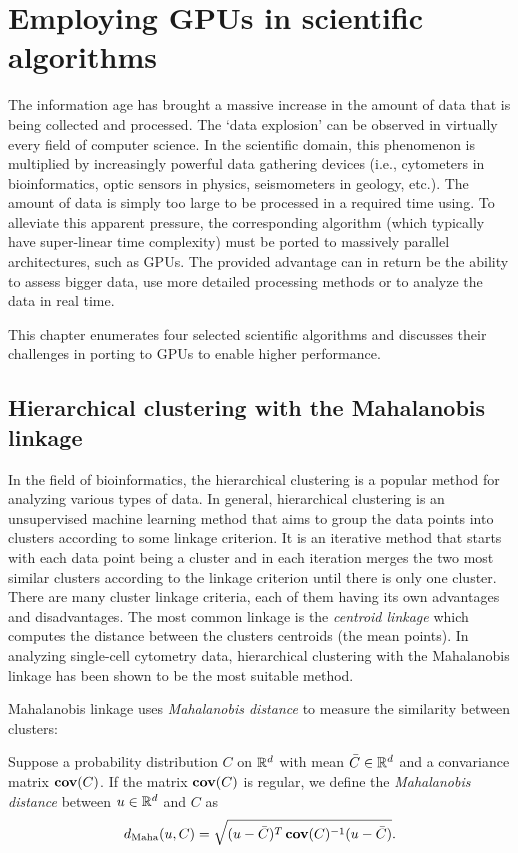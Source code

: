 \chapter{Employing GPUs in scientific algorithms}

The information age has brought a massive increase in the amount of data that is being collected and processed. The `data explosion' can be observed in virtually every field of computer science. In the scientific domain, this phenomenon is multiplied by increasingly powerful data gathering devices (i.e., cytometers in bioinformatics, optic sensors in physics, seismometers in geology, etc.). The amount of data is simply too large to be processed in a required time using. To alleviate this apparent pressure, the corresponding algorithm (which typically have super-linear time complexity) must be ported to massively parallel architectures, such as GPUs. The provided advantage can in return be the ability to assess bigger data, use more detailed processing methods or to analyze the data in real time.

This chapter enumerates four selected scientific algorithms and discusses their challenges in porting to GPUs to enable higher performance.

\section{Hierarchical clustering with the Ma\-ha\-la\-no\-bis linkage}

In the field of bioinformatics, the hierarchical clustering is a popular method for analyzing various types of data. 
In general, hierarchical clustering is an unsupervised machine learning method that aims to group the data points into clusters according to some linkage criterion.
It is an iterative method that starts with each data point being a cluster and in each iteration merges the two most similar clusters according to the linkage criterion until there is only one cluster.
There are many cluster linkage criteria, each of them having its own advantages and disadvantages. 
The most common linkage is the \emph{centroid linkage} which computes the distance between the clusters centroids (the mean points).
In analyzing single-cell cytometry data, hierarchical clustering with the Mahalanobis linkage has been shown to be the most suitable method.

Mahalanobis linkage uses \emph{Mahalanobis distance} to measure the similarity between clusters:
\begin{defn}
	Suppose a probability distribution $C$ on $\mathbb{R}^d$ with mean $\bar{C} \in \mathbb{R}^d$ and a convariance matrix $\operatorname{\textbf{cov}}(C)$. If the matrix $\operatorname{\textbf{cov}}(C)$ is regular, we define the \emph{Mahalanobis distance} between $u \in \mathbb{R}^d$ and $C$ as
	\begin{equation}
	d_\text{Maha}(u,C) = \sqrt{(u-\bar{C})^T\operatorname{\textbf{cov}}(C)^{-1}(u-\bar{C})}.
	\end{equation}\label{eq01:maha}
\end{defn}

